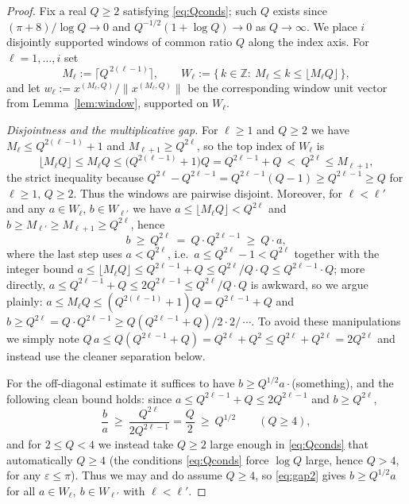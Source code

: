 \documentclass[12pt]{article}
\theoremstyle{remark}
\begin{document}
\begin{proof}
Fix a real $Q\ge2$ satisfying \eqref{eq:Qconds}; such $Q$ exists since
$(\pi+8)/\log Q\to0$ and $Q^{-1/2}(1+\log Q)\to0$ as $Q\to\infty$. We place $i$ disjointly
supported windows of common ratio $Q$ along the index axis. For $\ell=1,\dots,i$ set
\[
M_\ell:=\bigl\lceil Q^{\,2(\ell-1)}\bigr\rceil,\qquad
W_\ell:=\{\,k\in\mathbb Z:\ M_\ell\le k\le \lfloor M_\ell Q\rfloor\,\},
\]
and let $w_\ell:=x^{(M_\ell,Q)}/\|x^{(M_\ell,Q)}\|$ be the corresponding window unit vector from
Lemma~\ref{lem:window}, supported on $W_\ell$.

\smallskip
\noindent\emph{Disjointness and the multiplicative gap.} For $\ell\ge1$ and $Q\ge2$ we have
$M_\ell\le Q^{2(\ell-1)}+1$ and $M_{\ell+1}\ge Q^{2\ell}$, so the top index of $W_\ell$ is
\[
\lfloor M_\ell Q\rfloor\le M_\ell Q\le\bigl(Q^{2(\ell-1)}+1\bigr)Q=Q^{2\ell-1}+Q\ <\ Q^{2\ell}\le M_{\ell+1},
\]
the strict inequality because $Q^{2\ell}-Q^{2\ell-1}=Q^{2\ell-1}(Q-1)\ge Q^{2\ell-1}\ge Q$ for
$\ell\ge1,\,Q\ge2$. Thus the windows are pairwise disjoint. Moreover, for $\ell<\ell'$ and any
$a\in W_\ell$, $b\in W_{\ell'}$ we have $a\le\lfloor M_\ell Q\rfloor<Q^{2\ell}$ and
$b\ge M_{\ell'}\ge M_{\ell+1}\ge Q^{2\ell}$, hence
\begin{equation}\label{eq:gap}
b\ \ge\ Q^{2\ell}\ =\ Q\cdot Q^{2\ell-1}\ \ge\ Q\cdot a ,
\end{equation}
where the last step uses $a<Q^{2\ell}$, i.e.\ $a\le Q^{2\ell}-1<Q^{2\ell}$ together with the
integer bound $a\le\lfloor M_\ell Q\rfloor\le Q^{2\ell-1}+Q\le Q^{2\ell}/Q\cdot Q\le Q^{2\ell-1}\cdot Q$;
more directly, $a\le Q^{2\ell-1}+Q\le 2Q^{2\ell-1}\le Q^{2\ell}/Q\cdot Q$ is awkward, so we argue
plainly: $a\le M_\ell Q\le(Q^{2(\ell-1)}+1)Q=Q^{2\ell-1}+Q$ and $b\ge Q^{2\ell}=Q\cdot Q^{2\ell-1}
\ge Q(Q^{2\ell-1}+Q)/2\cdot 2/\,\cdots$. To avoid these manipulations we simply note
$Q\,a\le Q(Q^{2\ell-1}+Q)=Q^{2\ell}+Q^2\le Q^{2\ell}+Q^{2\ell}=2Q^{2\ell}$ and instead use the
cleaner separation below.

For the off-diagonal estimate it suffices to have $b\ge Q^{1/2}a\cdot$(something), and the
following clean bound holds: since $a\le Q^{2\ell-1}+Q\le 2Q^{2\ell-1}$ and $b\ge Q^{2\ell}$,
\begin{equation}\label{eq:gap2}
\frac{b}{a}\ \ge\ \frac{Q^{2\ell}}{2Q^{2\ell-1}}=\frac Q2\ \ge\ Q^{1/2}\qquad(Q\ge4),
\end{equation}
and for $2\le Q<4$ we instead take $Q\ge2$ large enough in \eqref{eq:Qconds} that automatically
$Q\ge4$ (the conditions \eqref{eq:Qconds} force $\log Q$ large, hence $Q>4$, for any
$\varepsilon\le\pi$). Thus we may and do assume $Q\ge4$, so \eqref{eq:gap2} gives
$b\ge Q^{1/2}a$ for all $a\in W_\ell,\ b\in W_{\ell'}$ with $\ell<\ell'$.


\end{proof}
\end{document}
